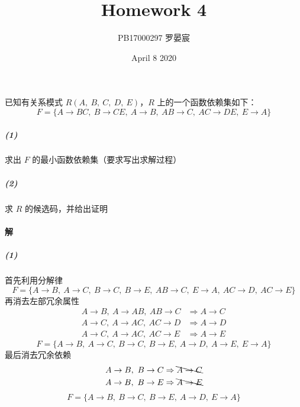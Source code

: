 \documentclass{article}
\title{Homework 4}
\author{PB17000297 罗晏宸}
\date{April 8 2020}
\makeatletter
\renewcommand{\section}{\@startsection{section}{1}{0mm}
                                {-5ex plus -.5ex minus -.2ex}
                                {3ex plus .2ex}
                                {\normalfont\large\bfseries}}
\makeatother
\begin{document}
\maketitle

\section{已知有关系模式 $R(A,\ B,\ C,\ D,\ E)$，$R$ 上的一个函数依赖集如下：$$F = \{ A \rightarrow BC,\ B \rightarrow CE,\ A \rightarrow B,\ AB \rightarrow C,\ AC \rightarrow DE,\ E \rightarrow A \}$$}
\subparagraph{(1)} 求出 $F$ 的最小函数依赖集（要求写出求解过程）
\subparagraph{(2)} 求 $R$ 的候选码，并给出证明

\paragraph{解}
\subparagraph{(1)}
首先利用分解律
\begin{equation*}
    F = \{A \rightarrow B,\ A \rightarrow C,\ B \rightarrow C,\ B \rightarrow E,\ AB \rightarrow C,\ E \rightarrow A,\ AC \rightarrow D,\ AC \rightarrow E\}
\end{equation*}
再消去左部冗余属性
\begin{align*}
    A \rightarrow B,\ A \rightarrow AB,\ AB \rightarrow C & \Rightarrow A \rightarrow C \\
    A \rightarrow C,\ A \rightarrow AC,\ AC \rightarrow D & \Rightarrow A \rightarrow D \\
    A \rightarrow C,\ A \rightarrow AC,\ AC \rightarrow E & \Rightarrow A \rightarrow E
\end{align*}
\begin{equation*}
    F = \{A \rightarrow B,\ A \rightarrow C,\ B \rightarrow C,\ B \rightarrow E,\ A \rightarrow D,\ A \rightarrow E,\ E \rightarrow A\}
\end{equation*}
最后消去冗余依赖
\begin{align*}
    A \rightarrow B,\ B \rightarrow C & \Rightarrow \bcancel{A \rightarrow C} \\
    A \rightarrow B,\ B \rightarrow E & \Rightarrow \bcancel{A \rightarrow E}
\end{align*}
\begin{equation*}
    F = \{A \rightarrow B,\ B \rightarrow C,\ B \rightarrow E,\ A \rightarrow D,\ E \rightarrow A\}
\end{equation*}
\end{document}
